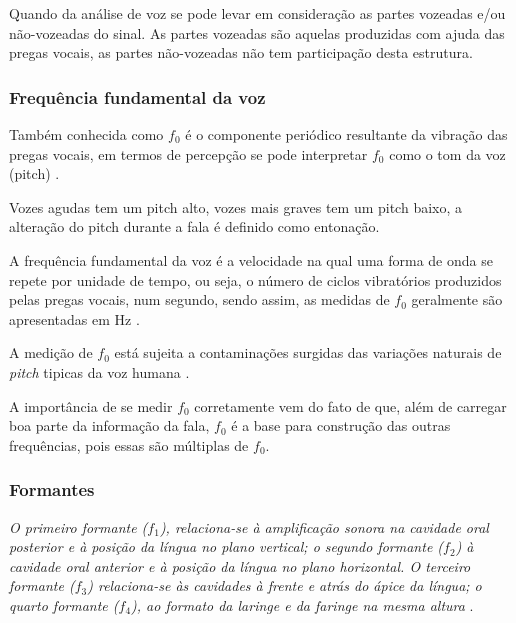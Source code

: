 \documentclass[a4paper,12pt,openright,oneside]{book}
\newenvironment{myenv}[1]
  {\begin{spacing}{#1}}
  {\end{spacing}}
\begin{document}
\begin{myenv}{1.5}
					\par Quando da análise de voz se pode levar em consideração as partes vozeadas e/ou não-vozeadas do sinal. As partes vozeadas são aquelas produzidas com ajuda das pregas vocais, as partes não-vozeadas não tem participação desta estrutura.
					
					\subsubsection{Frequência fundamental da voz}
						\par Também conhecida como $f_0$ é o componente periódico resultante da vibração das pregas vocais, em termos de percepção se pode interpretar $f_0$ como o tom da voz (pitch) \cite{kremer2014eficiencia}.
					
						\par Vozes agudas tem um pitch alto, vozes mais graves tem um pitch baixo, a alteração do pitch durante a fala é definido como entonação.
						
						\par A frequência fundamental da voz é a velocidade na qual uma forma de onda se repete
						por unidade de tempo, ou seja, o número de ciclos vibratórios produzidos pelas pregas vocais, num segundo, sendo assim, as medidas de $f_0$ geralmente são apresentadas em Hz \cite{freitas2013avaliaccao}.
					
						\par A medição de $f_0$ está sujeita a contaminações surgidas das variações naturais de \textit{pitch} tipicas da voz humana \cite{freitas2013avaliaccao}.
						
						\par A importância de se medir $f_0$ corretamente vem do fato de que, além de carregar boa parte da informação da fala, $f_0$ é a base para construção das outras frequências, pois essas são múltiplas de $f_0$.
						
						\subsubsection{Formantes}
						
						\par \textit{O primeiro formante ($f_1$), relaciona-se à  amplificação  sonora  na  cavidade  oral  posterior  e  à  posição  da  língua  no  plano  vertical;  o segundo  formante  ($f_2$)  à  cavidade  oral  anterior  e  à  posição  da  língua  no  plano  horizontal.  O terceiro  formante  ($f_3$)  relaciona-se  às  cavidades  à  frente  e  atrás  do  ápice  da  língua;  o  quarto formante  ($f_4$),  ao  formato  da  laringe  e  da  faringe  na  mesma  altura} \cite{valencca2014analise}.


\end{myenv}
\end{document}
